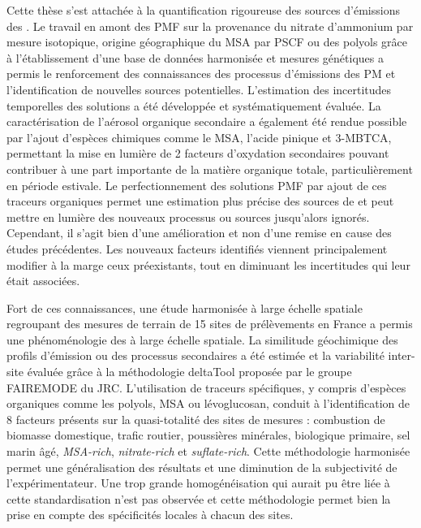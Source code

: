 Cette thèse s'est attachée à la quantification rigoureuse des sources d'émissions des \PMdix.
Le travail en amont des PMF sur la provenance du nitrate d'ammonium par mesure
isotopique, origine géographique du MSA par PSCF ou des polyols grâce à l'établissement
d'une base de données harmonisée et mesures génétiques a permis le renforcement des
connaissances des processus d'émissions des PM et l'identification de nouvelles sources
potentielles. L'estimation des incertitudes temporelles des solutions a été développée et systématiquement
évaluée.
La caractérisation de l'aérosol organique secondaire a également été rendue possible par
l'ajout d'espèces chimiques comme le MSA, l'acide pinique et 3-MBTCA, permettant la mise
en lumière de 2 facteurs d'oxydation secondaires pouvant contribuer à une part importante
de la matière organique totale, particulièrement en période estivale.
Le perfectionnement des solutions PMF par ajout de ces traceurs organiques permet une
estimation plus précise des sources de \PMdix{} et peut mettre en lumière des nouveaux
processus ou sources jusqu'alors ignorés.
Cependant, il s'agit bien d'une amélioration et non d'une remise en cause des études
précédentes. Les nouveaux facteurs identifiés viennent principalement modifier à la marge ceux
préexistants, tout en diminuant les incertitudes qui leur était associées.

Fort de ces connaissances, une étude harmonisée à large échelle spatiale regroupant des
mesures de terrain de 15 sites de prélèvements en France a permis une phénoménologie des
\PMdix{} à large échelle spatiale. La similitude géochimique des profils d'émission ou
des processus secondaires a été estimée et la variabilité inter-site évaluée grâce
à la méthodologie deltaTool proposée par le groupe FAIREMODE du JRC. L'utilisation de traceurs
spécifiques, y compris d'espèces organiques comme les polyols, MSA ou lévoglucosan,
conduit à l'identification de 8 facteurs présents sur la quasi-totalité des sites de
mesures : combustion de biomasse domestique, trafic routier, poussières minérales,
biologique primaire, sel marin âgé, \textit{MSA-rich}, \textit{nitrate-rich} et \textit{suflate-rich}.
Cette méthodologie harmonisée permet une généralisation des résultats et une diminution de
la subjectivité de l'expérimentateur. Une trop grande homogénéisation qui aurait pu être
liée à cette standardisation n'est pas observée et cette méthodologie permet bien la prise
en compte des spécificités locales à chacun des sites.

